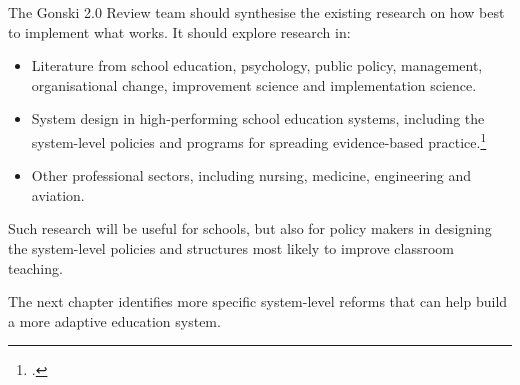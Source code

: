 The Gonski 2.0 Review team should synthesise the existing research on how best to implement what works. It should explore research in:

\begin{itemize}
    \item Literature from school education, psychology, public policy, management, organisational change, improvement science and implementation science. 
    \item System design in high-performing school education systems, including the system-level policies and programs for spreading evidence-based practice.\footcite{Jensen2012CatchingUpLearning}
    \item Other professional sectors, including nursing, medicine, engineering and aviation.
\end{itemize}

Such research will be useful for schools, but also for policy makers in designing the system-level policies and structures most likely to improve classroom teaching. 

The next chapter identifies more specific system-level reforms that can help build a more adaptive education system. 


